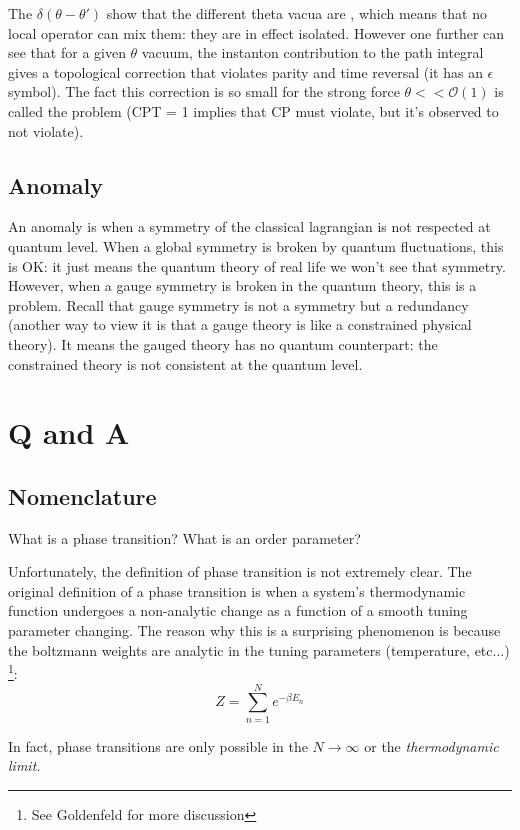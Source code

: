 \documentclass[11pt]{scrartcl}
\begin{document}
The $\delta(\theta - \theta')$ show that the different theta vacua are , which means that no local operator can mix them: they are in effect isolated.  However one further can see that for a given $\theta$ vacuum, the instanton contribution to the path integral gives a topological correction that violates parity and time reversal (it has an $\epsilon$ symbol).  The fact this correction is so small for the strong force $\theta << \mathcal{O}(1)$ is called the  problem (CPT = 1 implies that CP must violate, but it's observed to not violate).
\subsection{Anomaly}
An anomaly is when a symmetry of the classical lagrangian is not respected at quantum level.  When a global symmetry is broken by quantum fluctuations, this is OK: it just means the quantum theory of real life we won't see that symmetry.  However, when a gauge symmetry is broken in the quantum theory, this is a problem.  Recall that gauge symmetry is not a symmetry but a redundancy (another way to view it is that a gauge theory is like a constrained physical theory).  It means the gauged theory has no quantum counterpart: the constrained theory is not consistent at the quantum level.

\section{Q and A}
\subsection{Nomenclature}


\begin{myquestion}
	What is a phase transition?  What is an order parameter?
\end{myquestion}
Unfortunately, the definition of phase transition is not extremely clear. The original definition of a phase transition is when a system's thermodynamic function undergoes a non-analytic change as a function of a smooth tuning parameter changing.  The reason why this is a surprising phenomenon is because the boltzmann weights are analytic in the tuning parameters (temperature, etc...) \footnote{See Goldenfeld for more discussion}:
\[Z = \sum_{n=1}^N e^{-{\beta E_n}} \]

In fact, phase transitions are only possible in the $N \rightarrow  \infty$ or the \emph{thermodynamic limit.}
\end{document}
